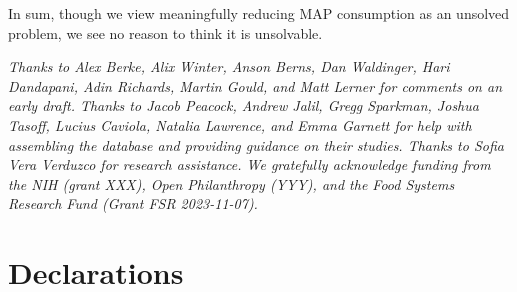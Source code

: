 \documentclass[sn-nature,referee,pdflatex]{sn-jnl}
\begin{document}
In sum, though we view meaningfully reducing MAP consumption as an
unsolved problem, we see no reason to think it is unsolvable.


\emph{Thanks to Alex Berke, Alix Winter, Anson Berns, Dan Waldinger,
Hari Dandapani, Adin Richards, Martin Gould, and Matt Lerner for
comments on an early draft. Thanks to Jacob Peacock, Andrew Jalil, Gregg
Sparkman, Joshua Tasoff, Lucius Caviola, Natalia Lawrence, and Emma
Garnett for help with assembling the database and providing guidance on
their studies. Thanks to Sofia Vera Verduzco for research assistance. We
gratefully acknowledge funding from the NIH (grant XXX), Open
Philanthropy (YYY), and the Food Systems Research Fund (Grant FSR
2023-11-07).}

\section*{Declarations}\label{declarations}

\newpage
\end{document}
